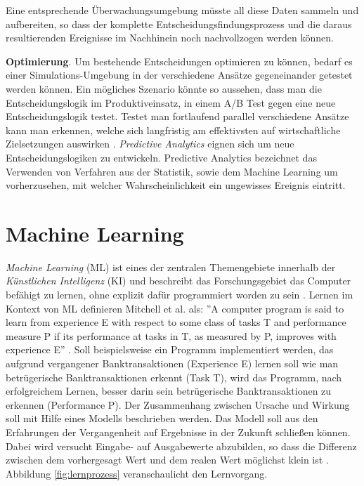 Eine entsprechende Überwachungsumgebung müsste all diese Daten sammeln und aufbereiten, so dass der komplette Entscheidungsfindungsprozess und die daraus resultierenden Ereignisse im Nachhinein noch nachvollzogen werden können.

\textbf{Optimierung}. Um bestehende Entscheidungen optimieren zu können, bedarf es einer Simulations-Umgebung in der verschiedene Ansätze gegeneinander getestet werden können. Ein mögliches Szenario könnte so aussehen, dass man die Entscheidungslogik im Produktiveinsatz, in einem A/B Test gegen eine neue Entscheidungslogik testet. Testet man fortlaufend parallel verschiedene Ansätze kann man erkennen, welche sich langfristig am effektivsten auf wirtschaftliche Zielsetzungen auswirken \cite[vgl. S. 173]{JT11}. \emph{Predictive Analytics} eignen sich um neue Entscheidungslogiken zu entwickeln. Predictive Analytics bezeichnet \cite[vgl. S. 5]{BG15} das Verwenden von Verfahren aus der Statistik, sowie dem Machine Learning um vorherzusehen, mit welcher Wahrscheinlichkeit ein ungewisses Ereignis eintritt.   
  
\section{Machine Learning}
\label{sec:Machine_Learning2}

\emph{Machine Learning} (ML) ist eines der zentralen Themengebiete innerhalb der  \emph{Künstlichen Intelligenz} (KI) \cite[vgl. S. 2082]{JW12} und beschreibt das Forschungsgebiet das Computer befähigt zu lernen, ohne explizit dafür programmiert worden zu sein \cite[vgl. S. 1]{AM14}. Lernen im Kontext von ML definieren Mitchell et al. als: ''A computer program is said to learn from experience E with respect to some class of tasks T and performance measure P if its performance at tasks in T, as measured by P, improves with experience E'' \cite{MT97}. Soll beispielsweise ein Programm implementiert werden, das aufgrund vergangener Banktransaktionen (Experience E) lernen soll wie man betrügerische Banktransaktionen erkennt (Task T), wird das Programm, nach erfolgreichem Lernen, besser darin sein betrügerische Banktransaktionen zu erkennen (Performance P). Der Zusammenhang zwischen Ursache und Wirkung soll mit Hilfe eines Modells beschrieben werden. Das Modell soll aus den Erfahrungen der Vergangenheit auf Ergebnisse in der Zukunft schließen können. Dabei wird versucht Eingabe- auf Ausgabewerte abzubilden, so dass die Differenz zwischen dem vorhergesagt Wert und dem realen Wert möglichst klein ist \cite[vgl. S. 68]{EM17}. Abbildung \ref{fig:lernprozess} veranschaulicht den Lernvorgang.   


